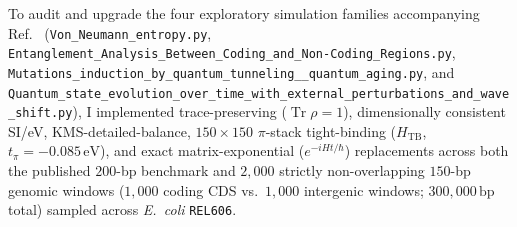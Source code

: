 \documentclass[10pt,letterpaper]{article}
\theoremstyle{plain}
\theoremstyle{definition}
\newcommand{\Tr}{\operatorname{Tr}}
\begin{document}
To audit and upgrade the four exploratory simulation families accompanying Ref.~\cite{garcia2026dna} (\texttt{Von\_\allowbreak Neumann\_\allowbreak entropy.py}, \texttt{Entanglement\_\allowbreak Analysis\_\allowbreak Between\_\allowbreak Coding\_\allowbreak and\_\allowbreak Non-Coding\_\allowbreak Regions.py}, \texttt{Mutations\_\allowbreak induction\_\allowbreak by\_\allowbreak quantum\_\allowbreak tunneling\_\_\allowbreak quantum\_\allowbreak aging.py}, and \texttt{Quantum\_\allowbreak state\_\allowbreak evolution\_\allowbreak over\_\allowbreak time\_\allowbreak with\_\allowbreak external\_\allowbreak perturbations\_\allowbreak and\_\allowbreak wave\_\allowbreak shift.py}), I implemented trace-preserving ($\Tr\rho = 1$), dimensionally consistent SI/eV, KMS-detailed-balance, $150 \times 150$ $\pi$-stack tight-binding ($H_{\mathrm{TB}}$, $t_\pi = -0.085\,\mathrm{eV}$), and exact matrix-exponential ($e^{-iHt/\hbar}$) replacements across both the published $200$-bp benchmark and $2{,}000$ strictly non-overlapping $150$-bp genomic windows ($1{,}000$ coding CDS vs.\ $1{,}000$ intergenic windows; $300{,}000\,\mathrm{bp}$ total) sampled across \emph{E.\ coli} \texttt{REL606}.
\end{document}
